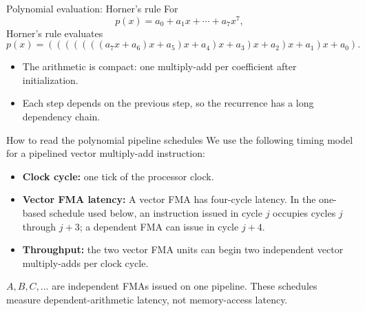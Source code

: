\documentclass[aspectratio=169,11pt]{beamer}
\newcommand{\x}{\bm{x}}
\newcommand{\y}{\bm{y}}
\begin{document}
\begin{frame}{Polynomial evaluation: Horner's rule}
\small
For
\[
  p(x)=a_0+a_1x+\cdots+a_7x^7,
\]
Horner's rule evaluates
\[
  p(x)=(((((((a_7x+a_6)x+a_5)x+a_4)x+a_3)x+a_2)x+a_1)x+a_0).
\]
\begin{itemize}
  \item The arithmetic is compact: one multiply-add per coefficient after
        initialization.
  \item Each step depends on the previous step, so the recurrence has a long
        dependency chain.
\end{itemize}
\end{frame}

\begin{frame}{How to read the polynomial pipeline schedules}
\footnotesize
We use the following timing model for a pipelined vector multiply-add
instruction:
\begin{itemize}\setlength{\itemsep}{0pt}
  \item \textbf{Clock cycle:} one tick of the processor clock.
  \item \textbf{Vector FMA latency:} A vector FMA has four-cycle latency. In
        the one-based schedule used below, an instruction issued in cycle $j$
        occupies cycles $j$ through $j+3$; a dependent FMA can issue in cycle
        $j+4$.
  \item \textbf{Throughput:} the two vector FMA units can begin two
        independent vector multiply-adds per clock cycle.
\end{itemize}
\begin{center}
\end{center}
\begin{center}
$A,B,C,\ldots$ are independent FMAs issued on one pipeline.  These schedules
measure dependent-arithmetic latency, not memory-access latency.
\end{center}
\end{frame}
\end{document}

